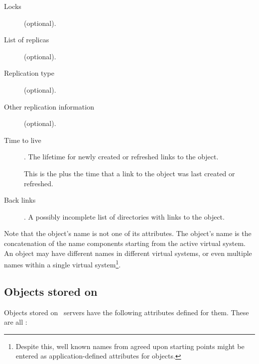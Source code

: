 \begin{description}
\item[Locks] (optional).

\item[List of replicas] (optional).  

\item[Replication type] (optional).  

\item[Other replication information] (optional).  

\item[Time to live].  The lifetime for newly created or refreshed
links to the object.  

\item[]  This is the  plus the
time that a link to the object was last created or refreshed.

\item[Back links].  A possibly incomplete list of directories
with links to the object.
\end{description}

Note that the object's name is not one of its attributes.  The
object's name is the concatenation of the name components starting from the
active virtual system.  An object may have different names in
different virtual systems, or even multiple names within a single
virtual system\footnote{Despite this, well known names from agreed
upon starting points might be entered as application-defined attributes for
objects.}.

\subsection{Objects stored on \unix}

Objects stored on \unix\ servers have the following attributes defined
for them.  These are all :

